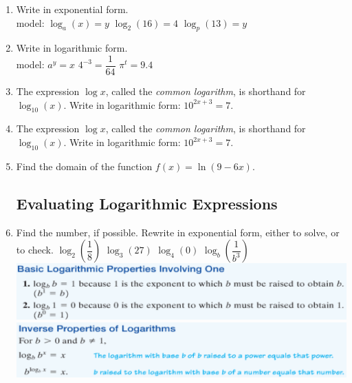 \begin{enumerate}
\item Write in exponential form.  \\
model: $\log_a(x)=y$ \hspace{1in} $\log_2 (16) = 4$ \hspace{1in} $\log_p (13) = y$\\[1in]

\item Write in logarithmic form. \\
model: $a^y = x$  \hspace{1in} $4^{-3} = \dfrac{1}{64}$ \hspace{1in} $\pi^t = 9.4$ \\[.5in]


\item The expression $\log x$, called the \emph{common logarithm}, is shorthand for $\log_{10}(x)$. Write in logarithmic form: $10^{2x+3} = 7$. \\[.5in]


\item The expression $\log x$, called the \emph{common logarithm}, is shorthand for $\log_{10}(x)$. Write in logarithmic form: $10^{2x+3} = 7$. \\[.5in]

\item Find the domain of the function $f(x) = \ln (9-6x)$. \\[.8in]



\subsection{Evaluating Logarithmic Expressions}
  
\item Find the number, if possible. Rewrite in exponential form, either to solve, or to check.
$\log_2 \left(  \dfrac{1}{8} \right)$  \hspace{1in} $\log_3 (27)$  \hspace{1in} $\log_4(0)$   \hspace{1in} $\log_b\left(\dfrac{1}{b^3}\right)$ \\[1in]




\includegraphics[scale=.9]{logprop1}
\includegraphics[scale=.9]{logprop2}


\end{enumerate}
